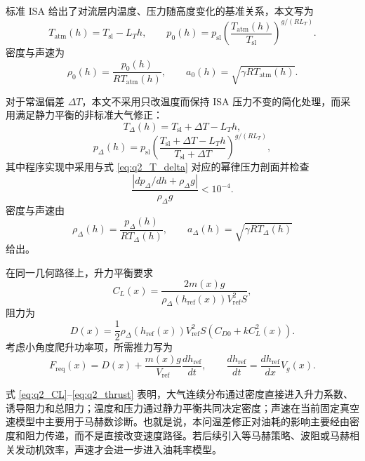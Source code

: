 \documentclass[withoutpreface,bwprint]{cumcmthesis}
\begin{document}
标准 ISA 给出了对流层内温度、压力随高度变化的基准关系\cite{icao_atmos}，本文写为
\begin{equation}
T_{\mathrm{atm}}(h)=T_{\mathrm{sl}}-L_T h,\qquad
p_0(h)=p_{\mathrm{sl}}\left(\frac{T_{\mathrm{atm}}(h)}{T_{\mathrm{sl}}}\right)^{g/(R L_T)}.
\end{equation}
密度与声速为
\begin{equation}
\rho_0(h)=\frac{p_0(h)}{R T_{\mathrm{atm}}(h)},\qquad
a_0(h)=\sqrt{\gamma R T_{\mathrm{atm}}(h)}.
\end{equation}

对于常温偏差 $\Delta T$，本文不采用只改温度而保持 ISA 压力不变的简化处理，而采用满足静力平衡的非标准大气修正：
\begin{equation}
T_\Delta(h)=T_{\mathrm{sl}}+\Delta T-L_T h,
\label{eq:q2_T_delta}
\end{equation}
\begin{equation}
p_\Delta(h)=p_{\mathrm{sl}}
\left(\frac{T_{\mathrm{sl}}+\Delta T-L_T h}{T_{\mathrm{sl}}+\Delta T}\right)^{g/(R L_T)},
\label{eq:q2_p_delta}
\end{equation}
其中程序实现中采用与式 \eqref{eq:q2_T_delta} 对应的幂律压力剖面并检查
\begin{equation}
\frac{|dp_\Delta/dh+\rho_\Delta g|}{\rho_\Delta g}<10^{-4}.
\end{equation}
密度与声速由
\begin{equation}
\rho_\Delta(h)=\frac{p_\Delta(h)}{R T_\Delta(h)},\qquad
a_\Delta(h)=\sqrt{\gamma R T_\Delta(h)}
\end{equation}
给出。

在同一几何路径上，升力平衡要求
\begin{equation}
C_L(x)=\frac{2m(x)g}{\rho_\Delta(h_{\mathrm{ref}}(x))V_{\mathrm{ref}}^2S},
\label{eq:q2_CL}
\end{equation}
阻力为
\begin{equation}
D(x)=\frac{1}{2}\rho_\Delta(h_{\mathrm{ref}}(x))V_{\mathrm{ref}}^2S
\left(C_{D0}+kC_L^2(x)\right).
\label{eq:q2_drag}
\end{equation}
考虑小角度爬升功率项，所需推力写为
\begin{equation}
F_{\mathrm{req}}(x)=D(x)+\frac{m(x)g}{V_{\mathrm{ref}}}\frac{dh_{\mathrm{ref}}}{dt},
\qquad
\frac{dh_{\mathrm{ref}}}{dt}=\frac{dh_{\mathrm{ref}}}{dx}V_g(x).
\label{eq:q2_thrust}
\end{equation}

式 \eqref{eq:q2_CL}--\eqref{eq:q2_thrust} 表明，大气连续分布通过密度直接进入升力系数、诱导阻力和总阻力；温度和压力通过静力平衡共同决定密度；声速在当前固定真空速模型中主要用于马赫数诊断。也就是说，本问温差修正对油耗的影响主要经由密度和阻力传递，而不是直接改变速度路径。若后续引入等马赫策略、波阻或马赫相关发动机效率，声速才会进一步进入油耗率模型。
\end{document}
